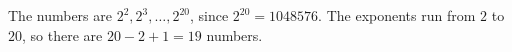 The numbers are $2^2,2^3,\dots,2^{20}$, since $2^{20}=1048576$. The exponents run from $2$ to $20$, so there are $20-2+1=\boxed{19}$ numbers.
